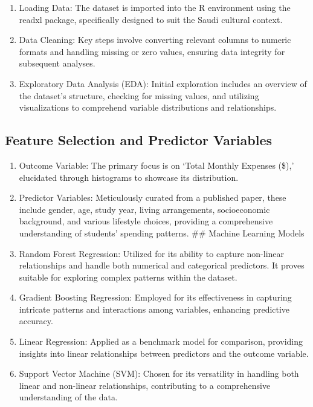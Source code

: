 \documentclass[
]{article}
\providecommand{\tightlist}{%
  \setlength{\itemsep}{0pt}\setlength{\parskip}{0pt}}
\begin{document}
\begin{enumerate}
\def\labelenumi{\alph{enumi}.}
\tightlist
\item
  Loading Data: The dataset is imported into the R environment using the
  readxl package, specifically designed to suit the Saudi cultural
  context.
\item
  Data Cleaning: Key steps involve converting relevant columns to
  numeric formats and handling missing or zero values, ensuring data
  integrity for subsequent analyses.
\item
  Exploratory Data Analysis (EDA): Initial exploration includes an
  overview of the dataset's structure, checking for missing values, and
  utilizing visualizations to comprehend variable distributions and
  relationships.
\end{enumerate}

\hypertarget{feature-selection-and-predictor-variables}{%
\subsection{Feature Selection and Predictor
Variables}\label{feature-selection-and-predictor-variables}}

\begin{enumerate}
\def\labelenumi{\alph{enumi}.}
\tightlist
\item
  Outcome Variable: The primary focus is on `Total Monthly Expenses
  (\$),' elucidated through histograms to showcase its distribution.
\item
  Predictor Variables: Meticulously curated from a published paper,
  these include gender, age, study year, living arrangements,
  socioeconomic background, and various lifestyle choices, providing a
  comprehensive understanding of students' spending patterns. \#\#
  Machine Learning Models
\item
  Random Forest Regression: Utilized for its ability to capture
  non-linear relationships and handle both numerical and categorical
  predictors. It proves suitable for exploring complex patterns within
  the dataset.
\item
  Gradient Boosting Regression: Employed for its effectiveness in
  capturing intricate patterns and interactions among variables,
  enhancing predictive accuracy.
\item
  Linear Regression: Applied as a benchmark model for comparison,
  providing insights into linear relationships between predictors and
  the outcome variable.
\item
  Support Vector Machine (SVM): Chosen for its versatility in handling
  both linear and non-linear relationships, contributing to a
  comprehensive understanding of the data.
\end{enumerate}
\end{document}
